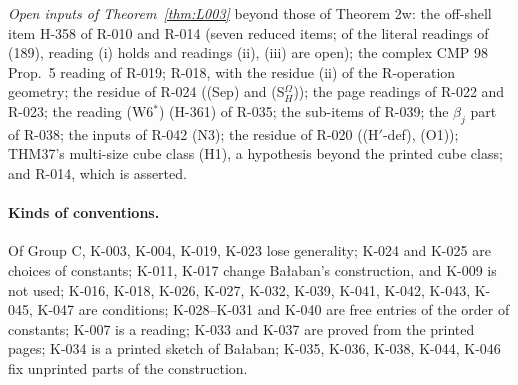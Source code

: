 \emph{Open inputs of Theorem~\ref{thm:L003}} beyond those of Theorem 2w: the off-shell item H-358 of R-010 and R-014 (seven reduced items; of the literal readings of (189), reading (i) holds and readings (ii), (iii) are open); the complex CMP 98 Prop.~5 reading of R-019; R-018, with the residue (ii) of the R-operation geometry; the residue of R-024 ((Sep) and (S$_H^\Omega$)); the page readings of R-022 and R-023; the reading (W6$^*$) (H-361) of R-035; the sub-items of R-039; the $\beta_j$ part of R-038; the inputs of R-042 (N3); the residue of R-020 ((H$'$-def), (O1)); THM37's multi-size cube class (H1), a hypothesis beyond the printed cube class; and R-014, which is asserted.

\paragraph{Kinds of conventions.} Of Group C, K-003, K-004, K-019, K-023 lose generality; K-024 and K-025 are choices of constants; K-011, K-017 change Ba{\l}aban's construction, and K-009 is not used; K-016, K-018, K-026, K-027, K-032, K-039, K-041, K-042, K-043, K-045, K-047 are conditions; K-028--K-031 and K-040 are free entries of the order of constants; K-007 is a reading; K-033 and K-037 are proved from the printed pages; K-034 is a printed sketch of Ba{\l}aban; K-035, K-036, K-038, K-044, K-046 fix unprinted parts of the construction.

